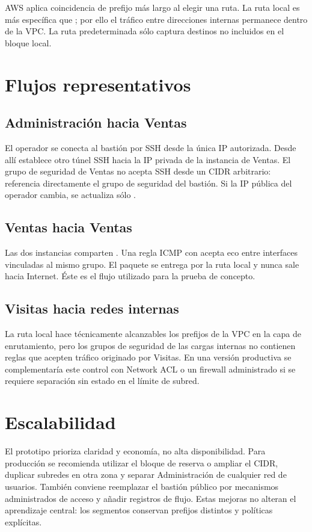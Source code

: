 AWS aplica coincidencia de prefijo más largo al elegir una ruta. La ruta local  es más específica que ; por ello el tráfico entre direcciones internas permanece dentro de la VPC. La ruta predeterminada sólo captura destinos no incluidos en el bloque local.

\section{Flujos representativos}

\subsection{Administración hacia Ventas}

El operador se conecta al bastión por SSH desde la única IP autorizada. Desde allí establece otro túnel SSH hacia la IP privada de la instancia de Ventas. El grupo de seguridad de Ventas no acepta SSH desde un CIDR arbitrario: referencia directamente el grupo de seguridad del bastión. Si la IP pública del operador cambia, se actualiza sólo .

\subsection{Ventas hacia Ventas}

Las dos instancias comparten . Una regla ICMP con  acepta eco entre interfaces vinculadas al mismo grupo. El paquete se entrega por la ruta local y nunca sale hacia Internet. Éste es el flujo utilizado para la prueba de concepto.

\subsection{Visitas hacia redes internas}

La ruta local hace técnicamente alcanzables los prefijos de la VPC en la capa de enrutamiento, pero los grupos de seguridad de las cargas internas no contienen reglas que acepten tráfico originado por Visitas. En una versión productiva se complementaría este control con Network ACL o un firewall administrado si se requiere separación sin estado en el límite de subred.

\section{Escalabilidad}

El prototipo prioriza claridad y economía, no alta disponibilidad. Para producción se recomienda utilizar el bloque de reserva o ampliar el CIDR, duplicar subredes en otra zona y separar Administración de cualquier red de usuarios. También conviene reemplazar el bastión público por mecanismos administrados de acceso y añadir registros de flujo. Estas mejoras no alteran el aprendizaje central: los segmentos conservan prefijos distintos y políticas explícitas.
